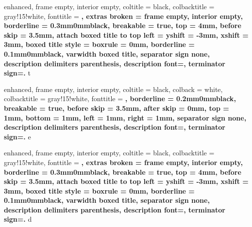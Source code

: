 \theoremstyle{definition}

\newtheorem{counter}{Contador}[section]
\newtheorem{problem}{Problema}[section]
\newtheorem{corollary}{Corolario}[chapter]

\newtheorem*{note}{Nota}



\newtheorem{theorem}{Teorema}[chapter]
{
    enhanced,
    frame empty,
    interior empty,
    coltitle = black,
    colbacktitle = gray!15!white,
    fonttitle = \bfseries,
    extras broken = {frame empty, interior empty},
    borderline = {0.3mm}{0mm}{black},
    breakable = true,
    top = 4mm,
    before skip = 3.5mm,
    attach boxed title to top left = {yshift = -3mm, xshift = 3mm},
    boxed title style = {boxrule = 0mm, borderline = {0.1mm}{0mm}{black}},
    varwidth boxed title,
    separator sign none, description delimiters parenthesis,
    description font=\bfseries,
    terminator sign={.\hspace{1mm}}
}
{t}

\newtheorem{example}{Ejemplo}[chapter]
{
    enhanced,
    frame empty,
    interior empty,
    coltitle = black,
    colback = white,
    colbacktitle = gray!15!white,
    fonttitle = \bfseries,
    borderline = {0.2mm}{0mm}{black},
    breakable = true,
    before skip = 3.5mm,
    after skip = 0mm,
    top = 1mm,
    bottom = 1mm,
    left = 1mm,
    right = 1mm,
    separator sign none, description delimiters parenthesis,
    description font=\bfseries,
    terminator sign={.\hspace{1mm}}
}
{e}


\newtheorem{definition}{Definición}[chapter]
{
    enhanced,
    frame empty,
    interior empty,
    coltitle = black,
    colbacktitle = gray!15!white,
    fonttitle = \bfseries,
    extras broken = {frame empty, interior empty},
    borderline = {0.3mm}{0mm}{black},
    breakable = true,
    top = 4mm,
    before skip = 3.5mm,
    attach boxed title to top left = {yshift = -3mm, xshift = 3mm},
    boxed title style = {boxrule = 0mm, borderline = {0.1mm}{0mm}{black}},
    varwidth boxed title,
    separator sign none, description delimiters parenthesis,
    description font=\bfseries,
    terminator sign={.\hspace{1mm}}
}
{d}


